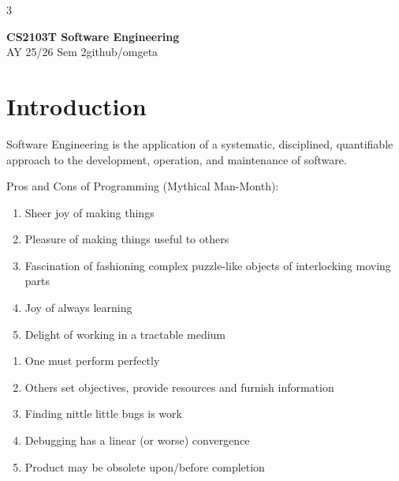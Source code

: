 \documentclass[12pt, a4paper]{article}
\newcommand{\mytitle}{CS2103T Software Engineering}
\newcommand{\myauthor}{github/omgeta}
\newcommand{\mydate}{AY 25/26 Sem 2}
\begin{document}
\raggedright
\footnotesize
\begin{multicols*}{3}
\setlength{\premulticols}{1pt}
\setlength{\postmulticols}{1pt}
\setlength{\multicolsep}{1pt}
\setlength{\columnsep}{2pt}

{\normalsize{\textbf{\mytitle}}}\\
{\footnotesize{\mydate\hspace{2pt}\textemdash\hspace{2pt}\myauthor}}
\section{Introduction}
Software Engineering is the application of a systematic, disciplined, quantifiable approach to the development, operation, and maintenance of software.

Pros and Cons of Programming (Mythical Man-Month):
\begin{enumerate}[$+$]
  \item Sheer joy of making things 
  \item Pleasure of making things useful to others 
  \item Fascination of fashioning complex puzzle-like objects of interlocking moving parts
  \item Joy of always learning 
  \item Delight of working in a tractable medium
\end{enumerate}
\begin{enumerate}[$-$]\vspace{-1pt}
  \item One must perform perfectly 
  \item Others set objectives, provide resources and furnish information 
  \item Finding nittle little bugs is work 
  \item Debugging has a linear (or worse) convergence
  \item Product may be obsolete upon/before completion
\end{enumerate}


\end{multicols*}
\end{document}
